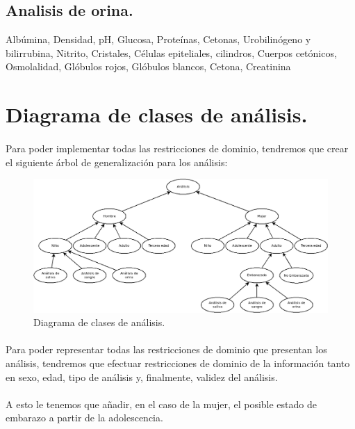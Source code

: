 \documentclass[a4paper,10pt]{article}
\begin{document}
\subsection{Analisis de orina.}
Albúmina, Densidad, pH, Glucosa, Proteínas, Cetonas, Urobilinógeno y bilirrubina, Nitrito, Cristales, Células epiteliales, cilindros, Cuerpos cetónicos, Osmolalidad, Glóbulos rojos, Glóbulos blancos, Cetona, Creatinina
\pagebreak

\section{Diagrama de clases de análisis.}
\paragraph{}
Para poder implementar todas las restricciones de dominio, tendremos que crear el siguiente árbol de generalización para los análisis:\\
\begin{figure}[hbt]
	\includegraphics[width=\textwidth]{img/analisis.png}
	\caption{Diagrama de clases de análisis.}
	\label{fig:diagramaanalisis}
\end{figure}
\paragraph{}
Para poder representar todas las restricciones de dominio que presentan los análisis, tendremos que efectuar restricciones de dominio de la información tanto en sexo, edad, tipo de análisis y, finalmente, validez del análisis.
\paragraph{}
A esto le tenemos que añadir, en el caso de la mujer, el posible estado de embarazo a partir de la adolescencia.
\end{document}
